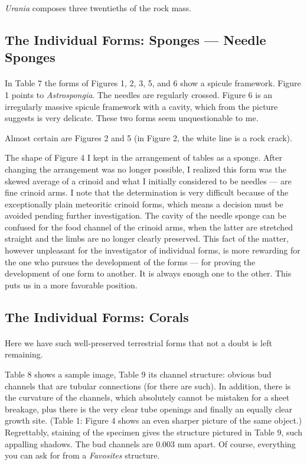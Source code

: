 \documentclass[a4paper, 12pt, oneside]{article}
\begin{document}
\emph{Urania} composes three twentieths of the rock mass.
\clearpage
\subsection{The Individual Forms: Sponges --- Needle Sponges}
\paragraph{}
In Table 7 the forms of Figures 1, 2, 3, 5, and 6 show a spicule framework. Figure 1 points to \emph{Astrospongia}. The needles are regularly crossed. Figure 6 is an irregularly massive spicule framework with a cavity, which from the picture suggests is very delicate. These two forms seem unquestionable to me.

Almost certain are Figures 2 and 5 (in Figure 2, the white line is a rock crack).

The shape of Figure 4 I kept in the arrangement of tables as a sponge. After changing the arrangement was no longer possible, I realized this form was the skewed average of a crinoid and what I initially considered to be needles --- are fine crinoid arms. I note that the determination is very difficult because of the exceptionally plain meteoritic crinoid forms, which means a decision must be avoided pending further investigation. The cavity of the needle sponge can be confused for the food channel of the crinoid arms, when the latter are stretched straight and the limbs are no longer clearly preserved. This fact of the matter, however unpleasant for the investigator of individual forms, is more rewarding for the one who pursues the development of the forms --- for proving the development of one form to another. It is always enough one to the other. This puts us in a more favorable position.
\clearpage
\subsection{The Individual Forms: Corals}
\paragraph{}
Here we have such well-preserved terrestrial forms that not a doubt is left remaining.

Table 8 shows a sample image, Table 9 its channel structure: obvious bud channels that are tubular connections (for there are such). In addition, there is the curvature of the channels, which absolutely cannot be mistaken for a sheet breakage, plus there is the very clear tube openings and finally an equally clear growth site. (Table 1: Figure 4 shows an even sharper picture of the same object.) Regrettably, staining of the specimen gives the structure pictured in Table 9, such appalling shadows. The bud channels are 0.003 mm apart. Of course, everything you can ask for from a \emph{Favosites} structure.
\end{document}
